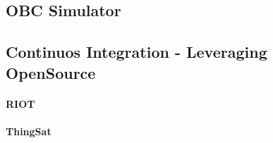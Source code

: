 \subsection{OBC Simulator}

\subsection{Continuos Integration - Leveraging OpenSource}
\paragraph*{RIOT}
\paragraph*{ThingSat}

